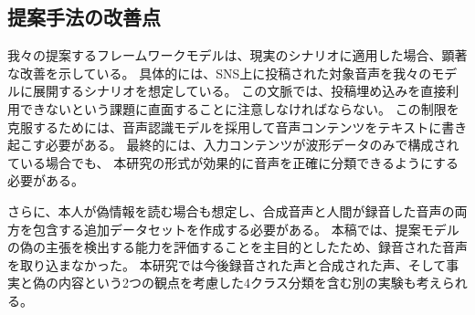 \subsection{提案手法の改善点}
我々の提案するフレームワークモデルは、現実のシナリオに適用した場合、顕著な改善を示している。
具体的には、SNS上に投稿された対象音声を我々のモデルに展開するシナリオを想定している。
この文脈では、投稿埋め込みを直接利用できないという課題に直面することに注意しなければならない。
この制限を克服するためには、音声認識モデルを採用して音声コンテンツをテキストに書き起こす必要がある。
最終的には、入力コンテンツが波形データのみで構成されている場合でも、
本研究の形式が効果的に音声を正確に分類できるようにする必要がある。

さらに、本人が偽情報を読む場合も想定し、合成音声と人間が録音した音声の両方を包含する追加データセットを作成する必要がある。
本稿では、提案モデルの偽の主張を検出する能力を評価することを主目的としたため、録音された音声を取り込まなかった。
本研究では今後録音された声と合成された声、そして事実と偽の内容という2つの観点を考慮した4クラス分類を含む別の実験も考えられる。